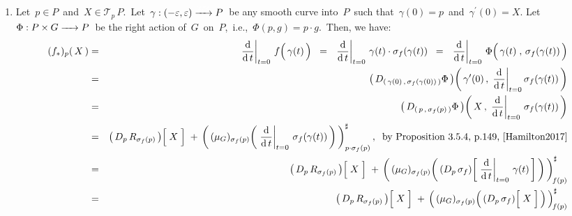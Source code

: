 \proof
\begin{enumerate}
\item
	Let \,$p \in P$\, and \,$X \in \mathcal{T}_{p}\,P$.\,
	\vskip -0.05cm
	\noindent
	Let
	\,$\gamma : (-\varepsilon,\varepsilon) \xrightarrow{{\color{white}222}} P$\,
	be any smooth curve into \,$P$\, such that \,$\gamma(0) = p$\, and \,$\gamma^{\prime}(0) = X$.
	\vskip -0.05cm
	\noindent
	Let \,$\Phi : P \times G \xrightarrow{{\color{white}222}} P$\,
	be the right action of \,$G$\, on \,$P$,\, i.e., \,$\Phi(p,g) = p \cdot g$.\,
	\vskip 0.01cm
	\noindent
	Then, we have:
	\begin{eqnarray*}
	(f_{*})_{p}(\,X\,)
	& = &
		\left.\dfrac{\d}{\d\,t}\right\vert_{t = 0}\,
		f\!\left(\,\overset{{\color{white}.}}{\gamma(t)}\,\right)
	\;\; = \;\;
		\left.\dfrac{\d}{\d\,t}\right\vert_{t = 0}\,
		\gamma(t) \cdot \sigma_{f}(\gamma(t))
	\;\; = \;\;
		\left.\dfrac{\d}{\d\,t}\right\vert_{t = 0}\,
		\Phi\!\left(\,
			\overset{{\color{white}.}}{\gamma(t)}
			\;,\,
			\sigma_{f}(\gamma(t))
			\,\right)
	\\
	& = &
		\left(\,D_{(\,\gamma(0)\,,\,\sigma_{f}(\gamma(0))\,)}\Phi\,\right)\!
		\left(\,
			\gamma^{\prime}(0)
			\,,\,
			\left.\dfrac{\d}{\d\,t}\right\vert_{t=0}
			\sigma_{f}(\gamma(t))
			\,\right)
	\\
	& = &
		\left(\,D_{(\,p\,,\,\sigma_{f}(p)\,)}\Phi\,\right)\!
		\left(\,
			X
			\,,\,
			\left.\dfrac{\d}{\d\,t}\right\vert_{t=0}\,\sigma_{f}(\gamma(t))
			\,\right)
	\\
	& = &
		\left(\,D_{p}\,R_{\sigma_{f}(p)}\,\right)\!\left[\;\overset{{\color{white}.}}{X}\;\right]
		\; + \,
		\left(\,
			(\mu_{G})_{\sigma_{f}(p)}\!\left(\,
				\left.\dfrac{\d}{\d\,t}\right\vert_{t=0}\,\sigma_{f}(\gamma(t))
				\,\right)
			\,\right)^{\sharp}_{p\cdot\sigma_{f}(p)},
		\;\;
		\textnormal{by Proposition 3.5.4, p.149, \cite{Hamilton2017}}
	\\
	& = &
		\left(\,D_{p}\,R_{\sigma_{f}(p)}\,\right)\!\left[\;\overset{{\color{white}.}}{X}\;\right]
		\; + \,
		\left(\,
			(\mu_{G})_{\sigma_{f}(p)}\!\left(\,
				(D_{p}\,\sigma_{f})\!
				\left[\,\left.\dfrac{\d}{\d\,t}\right\vert_{t=0}\,\gamma(t)\,\right]
				\,\right)
			\,\right)^{\sharp}_{\!f(p)}
	\\
	& = &
		\left(\,D_{p}\,R_{\sigma_{f}(p)}\,\right)\!\left[\;\overset{{\color{white}.}}{X}\;\right]
		\; + \,
		\left(\,
			(\mu_{G})_{\sigma_{f}(p)}\!\left(\,
				(D_{p}\,\sigma_{f})\!
				\left[\;\overset{{\color{white}.}}{X}\;\right]
				\,\right)
			\,\right)^{\sharp}_{\!f(p)}
	\\

\end{eqnarray*}
\end{enumerate}
